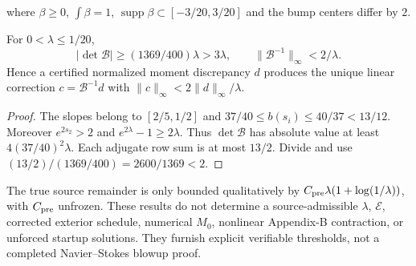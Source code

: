 where $\beta\ge0$, $\int\beta=1$, $\operatorname{supp}\beta
\subset[-3/20,3/20]$ and the bump centers differ by $2$.
\begin{proposition}
For $0<\lambda\le1/20$,
\[
|\det\mathcal B|\ge(1369/400)\lambda>3\lambda,
\qquad \|\mathcal B^{-1}\|_\infty<2/\lambda.
\]
Hence a certified normalized moment discrepancy $d$ produces
the unique linear correction $c=\mathcal B^{-1}d$ with
$\|c\|_\infty<2\|d\|_\infty/\lambda$.
\end{proposition}
\begin{proof}
The slopes belong to $[2/5,1/2]$ and
$37/40\le b(s_i)\le40/37<13/12$.
Moreover $e^{2s_2}>2$ and $e^{2\lambda}-1\ge2\lambda$.
Thus $\det\mathcal B$ has absolute value at least
$4(37/40)^2\lambda$. Each adjugate row sum is at most $13/2$.
Divide and use $(13/2)/(1369/400)=2600/1369<2$.
\end{proof}
The true source remainder is only bounded qualitatively by
$C_{\rm pre}\lambda(1+\log(1/\lambda))$, with $C_{\rm pre}$
unfrozen. These results do not determine a source-admissible
$\lambda$, $\mathcal E$, corrected exterior schedule, numerical
$M_0$, nonlinear Appendix-B contraction, or unforced startup
solutions. They furnish explicit verifiable thresholds, not a
completed Navier--Stokes blowup proof.
